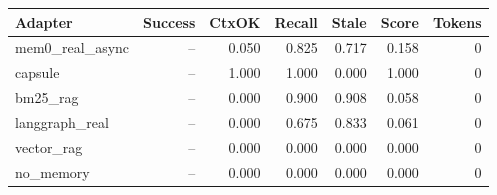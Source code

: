 \begin{tabular}{lrrrrrr}
\hline
Adapter & Success & CtxOK & Recall & Stale & Score & Tokens \\
\hline
mem0\_real\_async & -- & 0.050 & 0.825 & 0.717 & 0.158 & 0 \\
capsule & -- & 1.000 & 1.000 & 0.000 & 1.000 & 0 \\
bm25\_rag & -- & 0.000 & 0.900 & 0.908 & 0.058 & 0 \\
langgraph\_real & -- & 0.000 & 0.675 & 0.833 & 0.061 & 0 \\
vector\_rag & -- & 0.000 & 0.000 & 0.000 & 0.000 & 0 \\
no\_memory & -- & 0.000 & 0.000 & 0.000 & 0.000 & 0 \\
\hline
\end{tabular}

